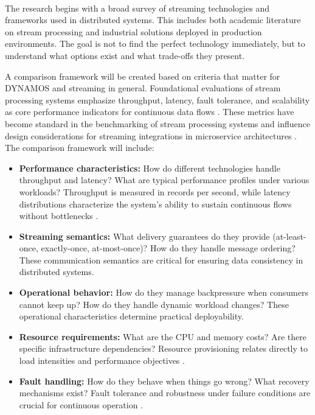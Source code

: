 \documentclass[a4paper,10pt,british]{scrartcl}
\begin{document}
\paragraph{}

The research begins with a broad survey of streaming technologies and frameworks used in distributed systems. This includes both academic literature on stream processing and industrial solutions deployed in production environments. The goal is not to find the perfect technology immediately, but to understand what options exist and what trade-offs they present.

A comparison framework will be created based on criteria that matter for DYNAMOS and streaming in general. Foundational evaluations of stream processing systems emphasize throughput, latency, fault tolerance, and scalability as core performance indicators for continuous data flows \cite{lote2022realtime,Henning2021ScalabilityMetrics}. These metrics have become standard in the benchmarking of stream processing systems and influence design considerations for streaming integrations in microservice architectures \cite{ververica2023scalability}. The comparison framework will include:

\begin{itemize}
  \item \textbf{Performance characteristics:} How do different technologies handle throughput and latency? What are typical performance profiles under various workloads? Throughput is measured in records per second, while latency distributions characterize the system's ability to sustain continuous flows without bottlenecks \cite{karimov2018benchmarking,pour2025performance}.
  \item \textbf{Streaming semantics:} What delivery guarantees do they provide (at-least-once, exactly-once, at-most-once)? How do they handle message ordering? These communication semantics are critical for ensuring data consistency in distributed systems.
  \item \textbf{Operational behavior:} How do they manage backpressure when consumers cannot keep up? How do they handle dynamic workload changes? These operational characteristics determine practical deployability.
  \item \textbf{Resource requirements:} What are the CPU and memory costs? Are there specific infrastructure dependencies? Resource provisioning relates directly to load intensities and performance objectives \cite{Henning2021ScalabilityMetrics}.
  \item \textbf{Fault handling:} How do they behave when things go wrong? What recovery mechanisms exist? Fault tolerance and robustness under failure conditions are crucial for continuous operation \cite{vogel2024faultRecovery}.
\end{itemize}
\end{document}
